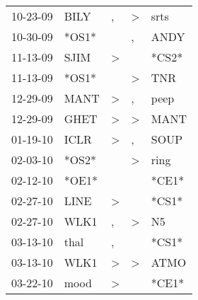 \begin{supertabular}{p{0.07\textwidth}p{0.06\textwidth}p{0.02\textwidth}p{0.02\textwidth}p{0.06\textwidth}}
          10-23-09\textsuperscript{} &           BILY\textsuperscript{} &                , &     \textgreater &           srts\textsuperscript{} \\
          10-30-09\textsuperscript{} &                            *OS1* &                  &                , &           ANDY\textsuperscript{} \\
          11-13-09\textsuperscript{} &           SJIM\textsuperscript{} &     \textgreater &                  &                            *CS2* \\
          11-13-09\textsuperscript{} &                            *OS1* &                  &     \textgreater &            TNR\textsuperscript{} \\
          12-29-09\textsuperscript{} &           MANT\textsuperscript{} &     \textgreater &                , &           peep\textsuperscript{} \\
          12-29-09\textsuperscript{} &           GHET\textsuperscript{} &     \textgreater &     \textgreater &           MANT\textsuperscript{} \\
          01-19-10\textsuperscript{} &           ICLR\textsuperscript{} &     \textgreater &                , &           SOUP\textsuperscript{} \\
          02-03-10\textsuperscript{} &                            *OS2* &                  &     \textgreater &           ring\textsuperscript{} \\
          02-12-10\textsuperscript{} &                            *OE1* &                  &                  &                            *CE1* \\
          02-27-10\textsuperscript{} &           LINE\textsuperscript{} &     \textgreater &                  &                            *CS1* \\
          02-27-10\textsuperscript{} &           WLK1\textsuperscript{} &                , &     \textgreater &             N5\textsuperscript{} \\
          03-13-10\textsuperscript{} &           thal\textsuperscript{} &                , &                  &                            *CS1* \\
          03-13-10\textsuperscript{} &           WLK1\textsuperscript{} &     \textgreater &     \textgreater &           ATMO\textsuperscript{} \\
          03-22-10\textsuperscript{} &           mood\textsuperscript{} &     \textgreater &                  &                            *CE1* \\

\end{supertabular}
